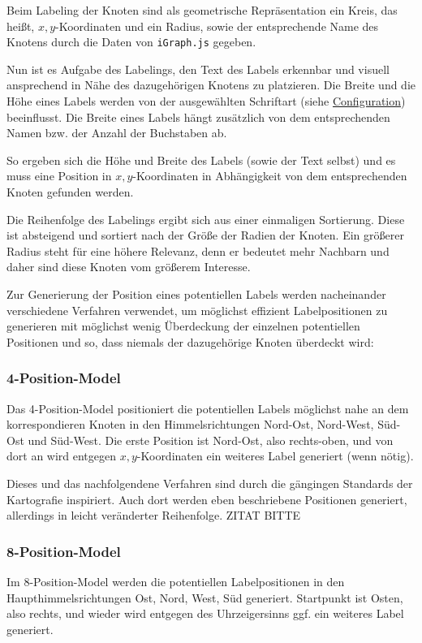 

Beim Labeling der Knoten sind als geometrische Repräsentation ein Kreis, das heißt, $x,y$-Koordinaten
und ein Radius, sowie der entsprechende Name des Knotens durch die Daten von \texttt{iGraph.js} gegeben.

Nun ist es Aufgabe des Labelings, den Text des Labels erkennbar und visuell ansprechend in Nähe des dazugehörigen Knotens zu platzieren.
Die Breite und die Höhe eines Labels werden von der ausgewählten Schriftart (siehe \hyperref[sec:configuration]{Configuration}) beeinflusst.
Die Breite eines Labels hängt zusätzlich von dem entsprechenden Namen bzw. der Anzahl der Buchstaben ab.

So ergeben sich die Höhe und Breite des Labels (sowie der Text selbst) und es muss eine Position in $x,y$-Koordinaten in Abhängigkeit
von dem entsprechenden Knoten gefunden werden.

Die Reihenfolge des Labelings ergibt sich aus einer einmaligen Sortierung.
Diese ist absteigend und sortiert nach der Größe der Radien der Knoten.
Ein größerer Radius steht für eine höhere Relevanz, denn er bedeutet mehr Nachbarn und daher sind diese Knoten vom größerem Interesse.

Zur Generierung der Position eines potentiellen Labels werden nacheinander verschiedene Verfahren verwendet, um möglichst effizient Labelpositionen zu generieren
mit möglichst wenig Überdeckung der einzelnen potentiellen Positionen und so, dass niemals der dazugehörige Knoten überdeckt wird:

\subsubsection{4-Position-Model}
\label{subsubsec:4pos}
Das 4-Position-Model positioniert die potentiellen Labels möglichst nahe an dem korrespondieren Knoten in den Himmelsrichtungen Nord-Ost, Nord-West, Süd-Ost und Süd-West.
Die erste Position ist Nord-Ost, also rechts-oben, und von dort an wird entgegen $x,y$-Koordinaten ein weiteres Label generiert (wenn nötig).

Dieses und das nachfolgendene Verfahren sind durch die gängingen Standards der Kartografie inspiriert. Auch dort werden eben beschriebene
Positionen generiert, allerdings in leicht veränderter Reihenfolge. ZITAT BITTE

\subsubsection{8-Position-Model}
\label{subsubsec:8pos}
Im 8-Position-Model werden die potentiellen Labelpositionen in den Haupthimmelsrichtungen Ost, Nord, West, Süd generiert.
Startpunkt ist Osten, also rechts, und wieder wird entgegen des Uhrzeigersinns ggf. ein weiteres Label generiert.

